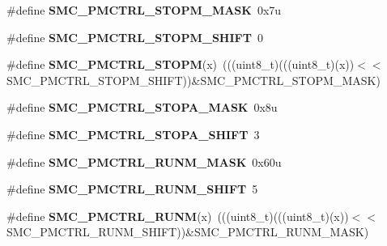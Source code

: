 \begin{DoxyCompactItemize}
\item 
\#define {\bfseries S\+M\+C\+\_\+\+P\+M\+C\+T\+R\+L\+\_\+\+S\+T\+O\+P\+M\+\_\+\+M\+A\+SK}~0x7u\hypertarget{group__SMC__Register__Masks_ga8df79d8a16a6d12e3b343eec59d9453c}{}\label{group__SMC__Register__Masks_ga8df79d8a16a6d12e3b343eec59d9453c}

\item 
\#define {\bfseries S\+M\+C\+\_\+\+P\+M\+C\+T\+R\+L\+\_\+\+S\+T\+O\+P\+M\+\_\+\+S\+H\+I\+FT}~0\hypertarget{group__SMC__Register__Masks_gaac7423086f31a8fbbfc8d18b1a876f26}{}\label{group__SMC__Register__Masks_gaac7423086f31a8fbbfc8d18b1a876f26}

\item 
\#define {\bfseries S\+M\+C\+\_\+\+P\+M\+C\+T\+R\+L\+\_\+\+S\+T\+O\+PM}(x)~(((uint8\+\_\+t)(((uint8\+\_\+t)(x))$<$$<$S\+M\+C\+\_\+\+P\+M\+C\+T\+R\+L\+\_\+\+S\+T\+O\+P\+M\+\_\+\+S\+H\+I\+FT))\&S\+M\+C\+\_\+\+P\+M\+C\+T\+R\+L\+\_\+\+S\+T\+O\+P\+M\+\_\+\+M\+A\+SK)\hypertarget{group__SMC__Register__Masks_gaa2ea36f819a21ef6b513564dc1453958}{}\label{group__SMC__Register__Masks_gaa2ea36f819a21ef6b513564dc1453958}

\item 
\#define {\bfseries S\+M\+C\+\_\+\+P\+M\+C\+T\+R\+L\+\_\+\+S\+T\+O\+P\+A\+\_\+\+M\+A\+SK}~0x8u\hypertarget{group__SMC__Register__Masks_gadd72ad662b62a7b51225b529fef2c77a}{}\label{group__SMC__Register__Masks_gadd72ad662b62a7b51225b529fef2c77a}

\item 
\#define {\bfseries S\+M\+C\+\_\+\+P\+M\+C\+T\+R\+L\+\_\+\+S\+T\+O\+P\+A\+\_\+\+S\+H\+I\+FT}~3\hypertarget{group__SMC__Register__Masks_gadfe89210f121f10b74f2fba55f059e1d}{}\label{group__SMC__Register__Masks_gadfe89210f121f10b74f2fba55f059e1d}

\item 
\#define {\bfseries S\+M\+C\+\_\+\+P\+M\+C\+T\+R\+L\+\_\+\+R\+U\+N\+M\+\_\+\+M\+A\+SK}~0x60u\hypertarget{group__SMC__Register__Masks_ga1a456925e291d6d53f4891b25fcaf8eb}{}\label{group__SMC__Register__Masks_ga1a456925e291d6d53f4891b25fcaf8eb}

\item 
\#define {\bfseries S\+M\+C\+\_\+\+P\+M\+C\+T\+R\+L\+\_\+\+R\+U\+N\+M\+\_\+\+S\+H\+I\+FT}~5\hypertarget{group__SMC__Register__Masks_ga8f8dc472f4a4b6ad1babae518c44d55e}{}\label{group__SMC__Register__Masks_ga8f8dc472f4a4b6ad1babae518c44d55e}

\item 
\#define {\bfseries S\+M\+C\+\_\+\+P\+M\+C\+T\+R\+L\+\_\+\+R\+U\+NM}(x)~(((uint8\+\_\+t)(((uint8\+\_\+t)(x))$<$$<$S\+M\+C\+\_\+\+P\+M\+C\+T\+R\+L\+\_\+\+R\+U\+N\+M\+\_\+\+S\+H\+I\+FT))\&S\+M\+C\+\_\+\+P\+M\+C\+T\+R\+L\+\_\+\+R\+U\+N\+M\+\_\+\+M\+A\+SK)\hypertarget{group__SMC__Register__Masks_gaa375b91daca0dd7f4b1452da903b5bdc}{}\label{group__SMC__Register__Masks_gaa375b91daca0dd7f4b1452da903b5bdc}


\end{DoxyCompactItemize}
